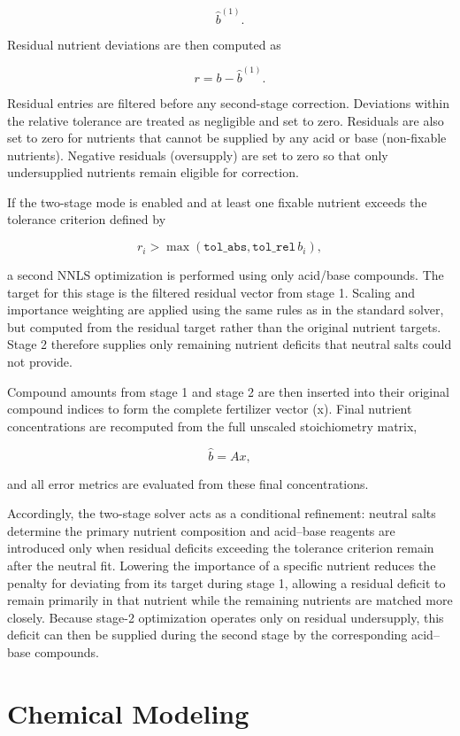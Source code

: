 \documentclass[
  letterpaper,
  DIV=11,
  numbers=noendperiod]{scrreprt}
\begin{document}
\[
\hat b^{(1)}.
\]

Residual nutrient deviations are then computed as

\[
r = b - \hat b^{(1)}.
\]

Residual entries are filtered before any second-stage correction.
Deviations within the relative tolerance are treated as negligible and
set to zero. Residuals are also set to zero for nutrients that cannot be
supplied by any acid or base (non-fixable nutrients). Negative residuals
(oversupply) are set to zero so that only undersupplied nutrients remain
eligible for correction.

If the two-stage mode is enabled and at least one fixable nutrient
exceeds the tolerance criterion defined by

\[
r_i > \max(\texttt{tol\_abs}, \texttt{tol\_rel}\, b_i),
\]

a second NNLS optimization is performed using only acid/base compounds.
The target for this stage is the filtered residual vector from stage 1.
Scaling and importance weighting are applied using the same rules as in
the standard solver, but computed from the residual target rather than
the original nutrient targets. Stage 2 therefore supplies only remaining
nutrient deficits that neutral salts could not provide.

Compound amounts from stage 1 and stage 2 are then inserted into their
original compound indices to form the complete fertilizer vector (x).
Final nutrient concentrations are recomputed from the full unscaled
stoichiometry matrix,

\[
\hat b = A x,
\]

and all error metrics are evaluated from these final concentrations.

Accordingly, the two-stage solver acts as a conditional refinement:
neutral salts determine the primary nutrient composition and acid--base
reagents are introduced only when residual deficits exceeding the
tolerance criterion remain after the neutral fit. Lowering the
importance of a specific nutrient reduces the penalty for deviating from
its target during stage 1, allowing a residual deficit to remain
primarily in that nutrient while the remaining nutrients are matched
more closely. Because stage-2 optimization operates only on residual
undersupply, this deficit can then be supplied during the second stage
by the corresponding acid--base compounds.

\section{Chemical Modeling}\label{chemical-modeling}
\end{document}
